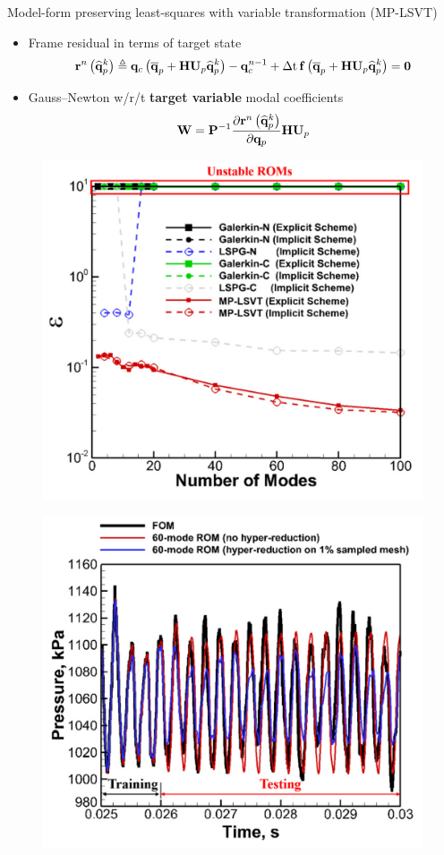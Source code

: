\documentclass[]{beamer}
\begin{document}
\begin{frame}{\small{Model-form preserving least-squares with variable transformation (MP-LSVT)\footnotemark[5]}}
	\begin{itemize}
		\item Frame residual in terms of target state
		\begin{equation*}
			\resFuncIter{\timeIdx}{\primVecCoef^{\newtonIdx}} \triangleq \consFunc{\primVecCent + \primScale \primTrial \primVecCoef^{\newtonIdx}} - \consVec^{\timeIdx-1} + \dt \, \rhsFunc{\primVecCent + \primScale \primTrial \primVecCoef^{\newtonIdx}} = \zeroVec
		\end{equation*}
		\item Gauss--Newton w/r/t \textbf{target variable} modal coefficients
		\begin{equation*}
			\testBasis = \consScaleInv \pde{\resFuncIter{\timeIdx}{\primVecCoef^{\newtonIdx}}}{\primVec} \primScale \primTrial
		\end{equation*}
	\end{itemize}
	\begin{minipage}{0.49\linewidth}
		\centering
		\begin{figure}
			\includegraphics[width=0.75\linewidth]{theory/mplsvt_err_vs_modes.png}
		\end{figure}
	\end{minipage}
	\begin{minipage}{0.49\linewidth}
		\centering
		\begin{figure}
			\includegraphics[width=0.75\linewidth]{theory/mplsvt_pressure_probe.png}

\end{figure}
\end{minipage}
\end{frame}
\end{document}
